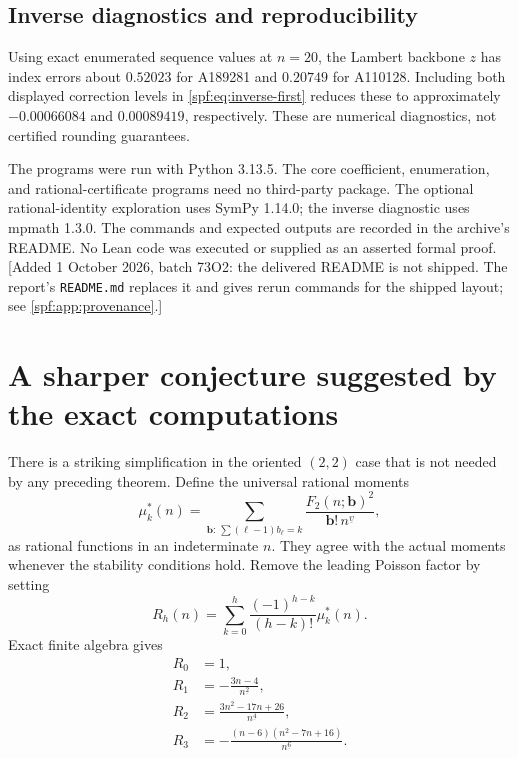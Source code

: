 \documentclass[11pt]{article}
\numberwithin{equation}{section}
\theoremstyle{definition}
\theoremstyle{remark}
\theoremstyle{definition}
\newcommand{\fall}[2]{{#1}^{\underline{#2}}}
\newcommand{\bfac}{\mathbf b!}
\begin{document}
\subsection{Inverse diagnostics and reproducibility}

Using exact enumerated sequence values at $n=20$, the Lambert backbone $z$
has index errors about $0.52023$ for A189281 and $0.20749$ for A110128.
Including both displayed correction levels in \eqref{spf:eq:inverse-first}
reduces these to approximately $-0.00066084$ and $0.00089419$, respectively.
These are numerical diagnostics, not certified rounding guarantees.

The programs were run with Python 3.13.5. The core coefficient, enumeration,
and rational-certificate programs need no third-party package. The optional
rational-identity exploration uses SymPy 1.14.0; the inverse diagnostic uses
mpmath 1.3.0. The commands and expected outputs are recorded in the archive's
README. No Lean code was executed or supplied as an asserted formal proof.
[Added 1 October 2026, batch 73O2: the delivered README is not shipped. The
report's \texttt{README.md} replaces it and gives rerun commands for the
shipped layout; see \cref{spf:app:provenance}.]

\section{A sharper conjecture suggested by the exact computations}
\label{spf:sec:collapse}

There is a striking simplification in the oriented $(2,2)$ case that is not
needed by any preceding theorem. Define the universal rational moments
\begin{equation}
 \mu_k^*(n)=\sum_{\mathbf b:\,\sum(\ell-1)b_\ell=k}
       \frac{F_2(n;\mathbf b)^2}{\bfac\,\fall nv},
\end{equation}
as rational functions in an indeterminate $n$. They agree with the actual
moments whenever the stability conditions hold. Remove the leading Poisson
factor by setting
\begin{equation}
 R_h(n)=\sum_{k=0}^{h}\frac{(-1)^{h-k}}{(h-k)!}\mu_k^*(n).
 \label{spf:eq:R}
\end{equation}
Exact finite algebra gives
\begin{align}
 R_0&=1,\\
 R_1&=-\frac{3n-4}{\fall n2},\\
 R_2&=\frac{3n^2-17n+26}{\fall n4},\\
 R_3&=-\frac{(n-6)(n^2-7n+16)}{\fall n6}.
\end{align}
\end{document}
